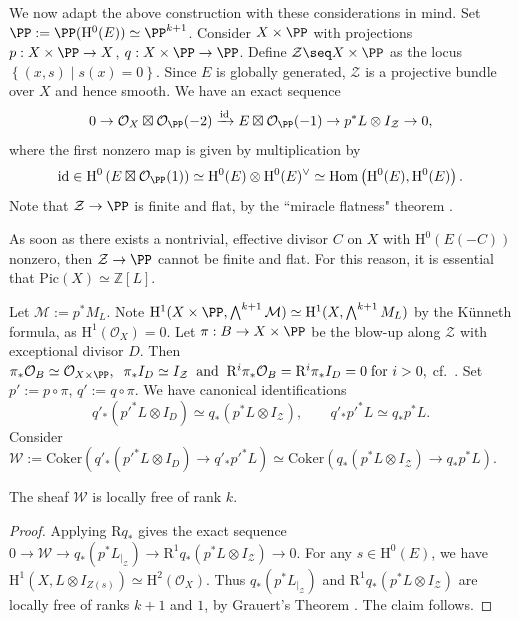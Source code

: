 We now adapt the above construction with these considerations in mind. Set $\PP:=\PP(\mathrm{H}^0(E))\simeq \PP^{k+1}$. Consider $X \times \PP$ with projections $p: X \times \PP \to X$, $q: X \times \PP \to \PP$. Define $\mathcal{Z} \seq X \times \PP$ as the locus $\left\{ (x,s) \; | \; s(x)=0 \right\}$. Since $E$ is globally generated, $\mathcal{Z}$ is a projective bundle over $X$ and hence smooth. We have an exact sequence
$$0 \to \mathcal{O}_X \boxtimes \mathcal{O}_{\PP}(-2) \xrightarrow{\mathrm{id}} E \boxtimes \mathcal{O}_{\PP}(-1) \to p^*L \otimes I_{\mathcal{Z}} \to 0,$$
where the first nonzero map is given by multiplication by $$\mathrm{id} \in \mathrm{H}^0\left(E \boxtimes \mathcal{O}_{\PP}(1)\right) \simeq \mathrm{H}^0(E) \otimes \mathrm{H}^0(E)^{\vee} \simeq \mathrm{Hom}\left(\mathrm{H}^0(E), \mathrm{H}^0(E)\right).$$
Note that $\mathcal{Z} \to \PP$ is finite and flat, by the ``miracle flatness" theorem \cite[Prop.\ 6.1.5]{EGA}.

\begin{rem}
\notready
As soon as there exists a nontrivial, effective divisor $C$ on $X$ with $\mathrm{H}^0(E(-C))$ nonzero, then $\mathcal{Z} \to \PP$ cannot be finite and flat. For this reason, it is essential that $\mathrm{Pic}(X) \simeq \mathbb{Z}[L]$.
\end{rem}


Let $\mathcal{M}:=p^* M_L$. Note $\mathrm{H}^1(X \times \PP,\bigwedge^{k+1}\mathcal{M}) \simeq \mathrm{H}^1(X, \bigwedge^{k+1}M_L) $ by the K\"unneth formula, as $\mathrm{H}^1(\mathcal{O}_X)=0$. Let $\pi:B \to  X \times \PP $ be the blow-up along $\mathcal{Z}$ with exceptional divisor $D$. Then
$\pi_*\mathcal{O}_B \simeq \mathcal{O}_{X \times \PP}, \; \; \pi_* I_{D} \simeq I_{\mathcal{Z}} \; \; \text{and} \; \; \mathrm{R}^i \pi_*\mathcal{O}_B=\mathrm{R}^i\pi_* I_D=0 \; \text{for $i>0$},$
cf.\ \cite[V, Prop.\ 3.4 and Ex.\ 3.1]{hartshorne}. Set $p':=p \circ \pi$, $q':=q \circ \pi$. We have canonical identifications
$$q'_*({p'}^*L \otimes I_D) \simeq q_*(p^*L \otimes I_{\mathcal{Z}}), \; \; \; \; \; \; \; q'_*{p'}^*L  \simeq q_* p^*L.$$
Consider $\mathcal{W}:=\text{Coker}\left(q'_*({p'}^*L \otimes I_D) \to q'_*{p'}^*L\right)\simeq  \text{Coker}\left(q_*({p}^*L \otimes I_{\mathcal{Z}}) \to q_*{p}^*L\right).$
\begin{lem}
\notready \label{very-first-lem}
The sheaf $\mathcal{W}$ is locally free of rank $k$.
\end{lem}
\begin{proof}
Applying $\mathrm{R}q_*$ gives the exact sequence $0 \to \mathcal{W} \to q_*(p^*L_{|_{\mathcal{Z}}}) \to \mathrm{R}^1q_*(p^*L \otimes I_{\mathcal{Z}})\to 0$. For any $s \in \mathrm{H}^0(E)$, we have $\mathrm{H}^1(X,L\otimes I_{Z(s)}) \simeq \mathrm{H}^2(\mathcal{O}_X)$. Thus $q_*(p^*L_{|_{\mathcal{Z}}}) $ and $\mathrm{R}^1q_*(p^*L \otimes I_{\mathcal{Z}})$ are locally free of ranks $k+1$ and $1$, by Grauert's Theorem \cite[III, \S 12]{hartshorne}. The claim follows.
\end{proof}


